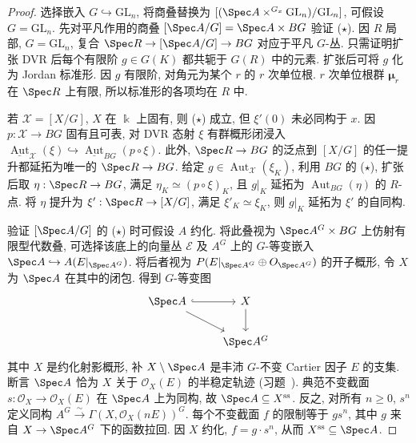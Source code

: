 \begin{proof}
选择嵌入 $G\hookrightarrow\mathrm{GL}_n$, 将商叠替换为 $[(\Spec A\times^{G_x}\mathrm{GL}_n)/\mathrm{GL}_n]$, 可假设 $G=\mathrm{GL}_n$. 先对平凡作用的商叠 $[\Spec A/G]=\Spec A\times BG$ 验证 ($\star$). 因 $R$ 局部, $G=\mathrm{GL}_n$, 复合 $\Spec R\to[\Spec A/G]\to BG$ 对应于平凡 $G$-丛. 只需证明扩张 DVR 后每个有限阶 $g\in G(K)$ 都共轭于 $G(R)$ 中的元素. 扩张后可将 $g$ 化为 Jordan 标准形. 因 $g$ 有限阶, 对角元为某个 $r$ 的 $r$ 次单位根. $r$ 次单位根群 $\boldsymbol\mu_r$ 在 $\Spec R$ 上有限, 所以标准形的各项均在 $R$ 中.

若 $\mathcal X=[X/G]$, $X$ 在 $\Bbbk$ 上固有, 则 ($\star$) 成立, 但 $\xi'(0)$ 未必同构于 $x$. 因 $p:\mathcal X\to BG$ 固有且可表, 对 DVR 态射 $\xi$ 有群概形闭浸入 $\underline{\operatorname{Aut}}_{\mathcal X}(\xi)\hookrightarrow\underline{\operatorname{Aut}}_{BG}(p\circ\xi)$. 此外, $\Spec R\to BG$ 的泛点到 $[X/G]$ 的任一提升都延拓为唯一的 $\Spec R\to BG$. 给定 $g\in\operatorname{Aut}_{\mathcal X}(\xi_K)$, 利用 $BG$ 的 ($\star$), 扩张后取 $\eta:\Spec R\to BG$, 满足 $\eta_K\simeq(p\circ\xi)_K$, 且 $g|_K$ 延拓为 $\operatorname{Aut}_{BG}(\eta)$ 的 $R$-点. 将 $\eta$ 提升为 $\xi':\Spec R\to[X/G]$, 满足 $\xi'_K\simeq\xi_K$, 则 $g|_K$ 延拓为 $\xi'$ 的自同构.

验证 $[\Spec A/G]$ 的 ($\star$) 时可假设 $A$ 约化. 将此叠视为 $\Spec A^G\times BG$ 上仿射有限型代数叠, 可选择该底上的向量丛 $\mathcal E$ 及 $A^G$ 上的 $G$-等变嵌入 $\Spec A\hookrightarrow\mathbb A(\mathcal E|_{\Spec A^G})$. 将后者视为 $\mathbb P(\mathcal E|_{\Spec A^G}\oplus\mathcal O_{\Spec A^G})$ 的开子概形, 令 $X$ 为 $\Spec A$ 在其中的闭包. 得到 $G$-等变图
\begin{align}\label{src:7.10.26}
\begin{tikzcd}[ampersand replacement=\&]\Spec A\arrow[r,hook]\arrow[dr]\&X\arrow[d]\\\&\Spec A^G\end{tikzcd}
\end{align}
其中 $X$ 是约化射影概形, 补 $X\setminus\Spec A$ 是丰沛 $G$-不变 Cartier 因子 $E$ 的支集. 断言 $\Spec A$ 恰为 $X$ 关于 $\mathcal O_X(E)$ 的半稳定轨迹 (习题~). 典范不变截面 $s:\mathcal O_X\to\mathcal O_X(E)$ 在 $\Spec A$ 上为同构, 故 $\Spec A\subseteq X^{\mathrm{ss}}$. 反之, 对所有 $n\geq0$, $s^n$ 定义同构 $A^G\xrightarrow{\sim}\Gamma(X,\mathcal O_X(nE))^G$. 每个不变截面 $f$ 的限制等于 $gs^n$, 其中 $g$ 来自 $X\to\Spec A^G$ 下的函数拉回. 因 $X$ 约化, $f=g\cdot s^n$, 从而 $X^{\mathrm{ss}}\subseteq\Spec A$.


\end{proof}
